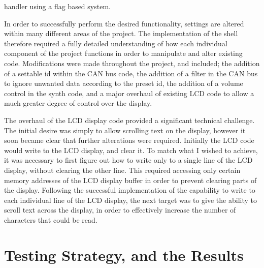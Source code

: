 handler using a flag based system.
\par\bigskip\noindent
In order to successfully perform the desired functionality, settings are altered 
within many different areas of the project. The implementation of the shell 
therefore required a fully detailed understanding of how each individual 
component of the project functions in order to manipulate and alter existing 
code. Modifications were made throughout the project, and included; the addition 
of a settable id within the CAN bus code, the addition of a filter in the CAN 
bus to ignore unwanted data according to the preset id, the addition of a 
volume control in the synth code, and a major overhaul of existing LCD code to 
allow a much greater degree of control over the display. 
\par\bigskip\noindent
The overhaul of the LCD display code provided a significant technical challenge. 
The initial desire was simply to allow scrolling text on the display, however 
it soon became clear that further alterations were required. Initially the LCD 
code would write to the LCD display, and clear it. To match what I wished to 
achieve, it was necessary to first figure out how to write only to a single 
line of the LCD display, without clearing the other line. This required 
accessing only certain memory addresses of the LCD display buffer in order to 
prevent clearing parts of the display. Following the successful implementation 
of the capability to write to each individual line of the LCD display, the next 
target was to give the ability to scroll text across the display, in order to 
effectively increase the number of characters that could be read. 


\section{Testing Strategy, and the Results}
